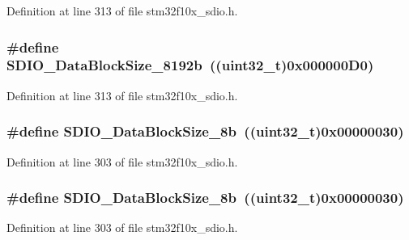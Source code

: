 Definition at line 313 of file stm32f10x\+\_\+sdio.\+h.

\subsubsection[{\texorpdfstring{S\+D\+I\+O\+\_\+\+Data\+Block\+Size\+\_\+8192b}{SDIO_DataBlockSize_8192b}}]{\setlength{\rightskip}{0pt plus 5cm}\#define S\+D\+I\+O\+\_\+\+Data\+Block\+Size\+\_\+8192b~(({\bf uint32\+\_\+t})0x000000\+D0)}\hypertarget{group___s_d_i_o___data___block___size_gaf61913f3eff52c0f728db9ffbdaca7d2}{}\label{group___s_d_i_o___data___block___size_gaf61913f3eff52c0f728db9ffbdaca7d2}


Definition at line 313 of file stm32f10x\+\_\+sdio.\+h.

\subsubsection[{\texorpdfstring{S\+D\+I\+O\+\_\+\+Data\+Block\+Size\+\_\+8b}{SDIO_DataBlockSize_8b}}]{\setlength{\rightskip}{0pt plus 5cm}\#define S\+D\+I\+O\+\_\+\+Data\+Block\+Size\+\_\+8b~(({\bf uint32\+\_\+t})0x00000030)}\hypertarget{group___s_d_i_o___data___block___size_ga14f91159c8c4faf49a335ed9b6a94d0b}{}\label{group___s_d_i_o___data___block___size_ga14f91159c8c4faf49a335ed9b6a94d0b}


Definition at line 303 of file stm32f10x\+\_\+sdio.\+h.

\subsubsection[{\texorpdfstring{S\+D\+I\+O\+\_\+\+Data\+Block\+Size\+\_\+8b}{SDIO_DataBlockSize_8b}}]{\setlength{\rightskip}{0pt plus 5cm}\#define S\+D\+I\+O\+\_\+\+Data\+Block\+Size\+\_\+8b~(({\bf uint32\+\_\+t})0x00000030)}\hypertarget{group___s_d_i_o___data___block___size_ga14f91159c8c4faf49a335ed9b6a94d0b}{}\label{group___s_d_i_o___data___block___size_ga14f91159c8c4faf49a335ed9b6a94d0b}


Definition at line 303 of file stm32f10x\+\_\+sdio.\+h.

